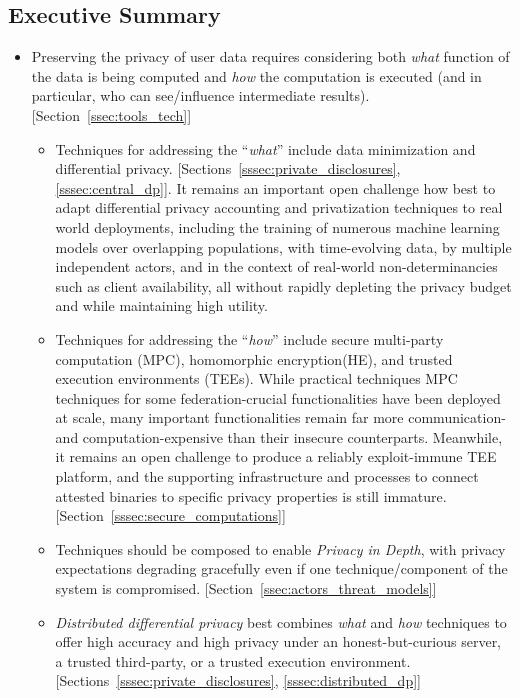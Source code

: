 \documentclass[11pt]{article}
\begin{document}
\subsection{Executive Summary}
\begin{itemize}
    \item Preserving the privacy of user data requires considering both {\em what} function of the data is being computed and {\em how} the computation is executed (and in particular, who can see/influence intermediate results). [Section~\ref{ssec:tools_tech}] 
    \begin{itemize}
        \item Techniques for addressing the ``{\em what}'' include data minimization and differential privacy.  [Sections~\ref{sssec:private_disclosures}, \ref{sssec:central_dp}].  It remains an important open challenge how best to adapt differential privacy accounting and privatization techniques to real world deployments, including the training of numerous machine learning models over overlapping populations, with time-evolving data, by multiple independent actors, and in the context of real-world non-determinancies such as client availability, all without rapidly depleting the privacy budget and while maintaining high utility.
        \item Techniques for addressing the ``{\em how}'' include secure multi-party computation (MPC), homomorphic encryption(HE), and trusted execution environments (TEEs).  While practical techniques MPC techniques for some federation-crucial functionalities have been deployed at scale, many important functionalities remain far more communication- and computation-expensive than their insecure counterparts.  Meanwhile, it remains an open challenge to produce a reliably exploit-immune TEE platform, and the supporting infrastructure and processes to connect attested binaries to specific privacy properties is still immature. [Section~\ref{sssec:secure_computations}]
        \item Techniques should be composed to enable {\em Privacy in Depth}, with privacy expectations degrading gracefully even if one technique/component of the system is compromised. [Section~\ref{ssec:actors_threat_models}]
        \item {\em Distributed differential privacy} best combines {\em what} and {\em how} techniques to offer high accuracy and high privacy under an honest-but-curious server, a trusted third-party, or a trusted execution environment.  [Sections~\ref{sssec:private_disclosures}, \ref{sssec:distributed_dp}]

\end{itemize}
\end{itemize}
\end{document}
